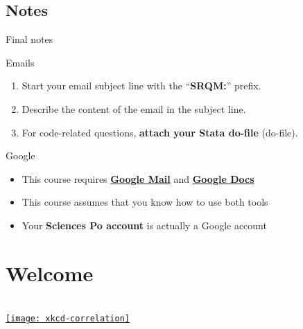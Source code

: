 \documentclass[t]{beamer}
\begin{document}
  \subsection{Notes}

  \begin{frame}[t]{Final notes}

    \begin{alertblock}{Emails}
      \begin{enumerate}
        \item Start your email subject line with the ``\textbf{SRQM:}'' prefix.%
        \item Describe the content of the email in the subject line.%
        \item For code-related questions, \textbf{attach your Stata do-file} (do-file).%
      \end{enumerate}
    \end{alertblock}

    \begin{block}{Google}
      \begin{itemize}
        \item This course requires \textbf{\href{http://mail.google.com/}{Google Mail}} %
          and \textbf{\href{http://docs.google.com/}{Google Docs}}
        \item This course assumes that you know how to use both tools
        \item Your \textbf{Sciences Po account} is actually a Google account
      \end{itemize}
    \end{block}

  \end{frame}


  \section{Welcome}

  \begin{frame}[t, plain]

    \vspace{.1\paperwidth}

    \begin{center}
      {%
      \Large {}}\\[.1\paperwidth]

      \href{http://xkcd.com/552/}{\texttt{[image: xkcd-correlation]}%
      }
    \end{center}

  \end{frame}
\end{document}
